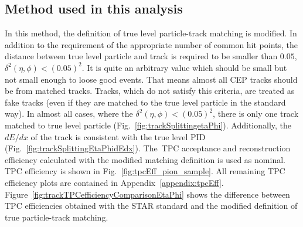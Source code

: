 \subsection{Method used in this analysis}\label{subsec:definitionTrueLevelMatching}
In this method, the definition of true level particle-track matching  is modified. In addition to the requirement of the appropriate number of common hit points, the distance between true level particle and track is required to be smaller than $0.05$, $\delta^{2}\left(\eta,\phi\right)<\left(0.05\right)^2$. It is quite an arbitrary value which should be small
but not small enough to loose good events. That means almost
all CEP tracks should be  from matched tracks.  Tracks, which do not satisfy this criteria, are treated as fake tracks (even if they are matched to the true level particle in the standard way). In almost all cases, where the $\delta^{2}\left(\eta,\phi\right)<\left(0.05\right)^2$, there is only one track matched to true level particle (Fig.~\ref{fig:trackSplittingetaPhi}). Additionally, the $dE/dx$ of the track is consistent with the true level PID (Fig.~\ref{fig:trackSplittingEtaPhidEdx}). The~TPC acceptance and  reconstruction efficiency calculated with the modified matching definition is used as nominal. TPC efficiency is shown in Fig.~\ref{fig:tpcEff_pion_sample}. All remaining TPC efficiency plots are contained in Appendix~\ref{appendix:tpcEff}. Figure~\ref{fig:trackTPCefficiencyComparisonEtaPhi} shows the difference between TPC efficiencies obtained with the STAR standard and the modified definition of true particle-track matching.
